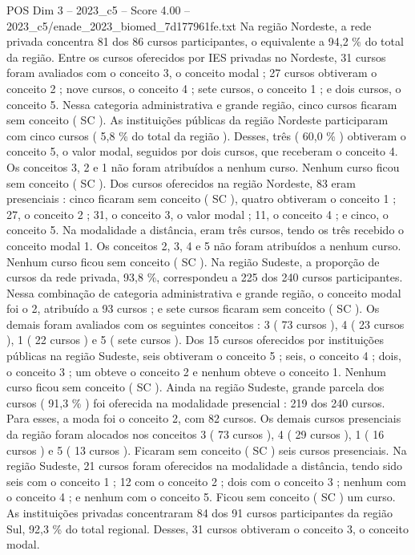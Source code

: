 \begin{textsample}{POS Dim 3 – 2023\_c5 – Score 4.00 – 2023\_c5/enade\_2023\_biomed\_7d177961fe.txt}
Na região Nordeste, a rede privada concentra 81 dos 86 cursos participantes, o equivalente a 94,2 \% do total da região.
Entre os cursos oferecidos por IES privadas no Nordeste, 31 cursos foram avaliados com o conceito 3, o conceito modal ; 27 cursos obtiveram o conceito 2 ; nove cursos, o conceito 4 ; sete cursos, o conceito 1 ; e dois cursos, o conceito 5.
Nessa categoria administrativa e grande região, cinco cursos ficaram sem conceito ( SC ).
As instituições públicas da região Nordeste participaram com cinco cursos ( 5,8 \% do total da região ).
Desses, três ( 60,0 \% ) obtiveram o conceito 5, o valor modal, seguidos por dois cursos, que receberam o conceito 4.
Os conceitos 3, 2 e 1 não foram atribuídos a nenhum curso.
Nenhum curso ficou sem conceito ( SC ).
Dos cursos oferecidos na região Nordeste, 83 eram presenciais : cinco ficaram sem conceito ( SC ), quatro obtiveram o conceito 1 ; 27, o conceito 2 ; 31, o conceito 3, o valor modal ; 11, o conceito 4 ; e cinco, o conceito 5.
Na modalidade a distância, eram três cursos, tendo os três recebido o conceito modal 1.
Os conceitos 2, 3, 4 e 5 não foram atribuídos a nenhum curso.
Nenhum curso ficou sem conceito ( SC ).
Na região Sudeste, a proporção de cursos da rede privada, 93,8 \%, correspondeu a 225 dos 240 cursos participantes.
Nessa combinação de categoria administrativa e grande região, o conceito modal foi o 2, atribuído a 93 cursos ; e sete cursos ficaram sem conceito ( SC ).
Os demais foram avaliados com os seguintes conceitos : 3 ( 73 cursos ), 4 ( 23 cursos ), 1 ( 22 cursos ) e 5 ( sete cursos ).
Dos 15 cursos oferecidos por instituições públicas na região Sudeste, seis obtiveram o conceito 5 ; seis, o conceito 4 ; dois, o conceito 3 ; um obteve o conceito 2 e nenhum obteve o conceito 1.
Nenhum curso ficou sem conceito ( SC ).
Ainda na região Sudeste, grande parcela dos cursos ( 91,3 \% ) foi oferecida na modalidade presencial : 219 dos 240 cursos.
Para esses, a moda foi o conceito 2, com 82 cursos.
Os demais cursos presenciais da região foram alocados nos conceitos 3 ( 73 cursos ), 4 ( 29 cursos ), 1 ( 16 cursos ) e 5 ( 13 cursos ).
Ficaram sem conceito ( SC ) seis cursos presenciais.
Na região Sudeste, 21 cursos foram oferecidos na modalidade a distância, tendo sido seis com o conceito 1 ; 12 com o conceito 2 ; dois com o conceito 3 ; nenhum com o conceito 4 ; e nenhum com o conceito 5.
Ficou sem conceito ( SC ) um curso.
As instituições privadas concentraram 84 dos 91 cursos participantes da região Sul, 92,3 \% do total regional.
Desses, 31 cursos obtiveram o conceito 3, o conceito modal.

\end{textsample}

